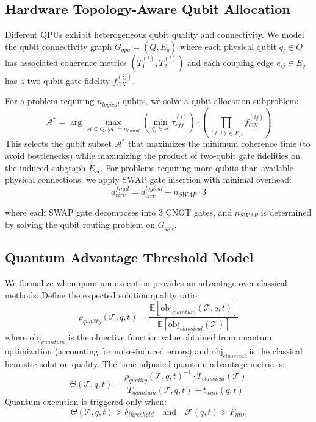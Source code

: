 \documentclass[lettersize,journal]{IEEEtran}
\begin{document}
\subsection{Hardware Topology-Aware Qubit Allocation}
\label{subsec:topology_aware}

Different QPUs exhibit heterogeneous qubit quality and connectivity. We model the qubit connectivity graph $G_{qpu} = (Q, E_q)$ where each physical qubit $q_i \in Q$ has associated coherence metrics $(T_1^{(i)}, T_2^{(i)})$ and each coupling edge $e_{ij} \in E_q$ has a two-qubit gate fidelity $f_{CX}^{(ij)}$. 

For a problem requiring $n_{logical}$ qubits, we solve a qubit allocation subproblem:
\begin{equation}
\mathcal{A}^* = \arg\max_{\mathcal{A} \subseteq Q, |\mathcal{A}| = n_{logical}} \left( \min_{q_i \in \mathcal{A}} \tau_{eff}^{(i)} \right) \cdot \left( \prod_{(i,j) \in E_{\mathcal{A}}} f_{CX}^{(ij)} \right)
\label{eq:qubit_allocation}
\end{equation}
This selects the qubit subset $\mathcal{A}^*$ that maximizes the minimum coherence time (to avoid bottlenecks) while maximizing the product of two-qubit gate fidelities on the induced subgraph $E_{\mathcal{A}}$. For problems requiring more qubits than available physical connections, we apply SWAP gate insertion with minimal overhead:
\begin{equation}
d_{circ}^{final} = d_{circ}^{logical} + n_{SWAP} \cdot 3
\label{eq:swap_overhead}
\end{equation}

where each SWAP gate decomposes into 3 CNOT gates, and $n_{SWAP}$ is determined by solving the qubit routing problem on $G_{qpu}$.

\subsection{Quantum Advantage Threshold Model}
\label{subsec:advantage_threshold}
We formalize when quantum execution provides an advantage over classical methods. Define the expected solution quality ratio:
\begin{equation}
\rho_{quality}(\mathcal{T}, q, t) = \frac{\mathbb{E}[\text{obj}_{quantum}(\mathcal{T}, q, t)]}{\mathbb{E}[\text{obj}_{classical}(\mathcal{T})]}
\label{eq:quality_ratio}
\end{equation}
where $\text{obj}_{quantum}$ is the objective function value obtained from quantum optimization (accounting for noise-induced errors) and $\text{obj}_{classical}$ is the classical heuristic solution quality. The time-adjusted quantum advantage metric is:
\begin{equation}
\Theta(\mathcal{T}, q, t) = \frac{\rho_{quality}(\mathcal{T}, q, t)^{-1} \cdot T_{classical}(\mathcal{T})}{T_{quantum}(\mathcal{T}, q, t) + t_{wait}(q, t)}
\label{eq:advantage_metric}
\end{equation}
Quantum execution is triggered only when:
\begin{equation}
\Theta(\mathcal{T}, q, t) > \delta_{threshold} \quad \text{and} \quad \mathcal{F}(q, t) > F_{min}
\label{eq:execution_condition}
\end{equation}
\end{document}
